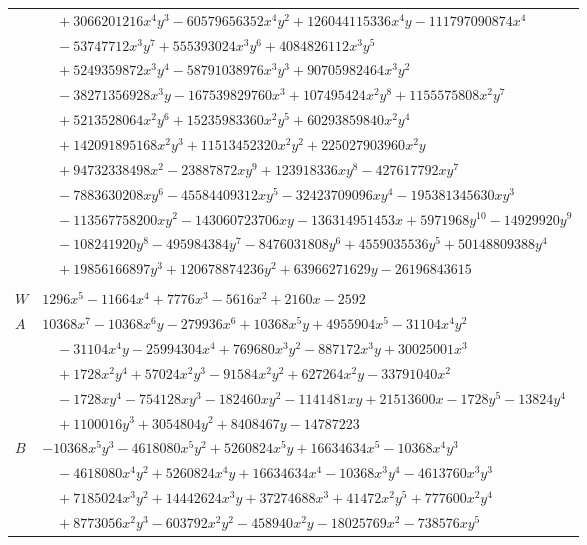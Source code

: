 \documentclass[11pt]{article}
\begin{document}
\begin{longtable}{@{}ll@{}}
 & $\quad +3066201216x^{4}y^{3}-60579656352x^{4}y^{2}+126044115336x^{4}y-111797090874x^{4}$\\
 & $\quad -53747712x^{3}y^{7}+555393024x^{3}y^{6}+4084826112x^{3}y^{5}$\\
 & $\quad +5249359872x^{3}y^{4}-58791038976x^{3}y^{3}+90705982464x^{3}y^{2}$\\
 & $\quad -38271356928x^{3}y-167539829760x^{3}+107495424x^{2}y^{8}+1155575808x^{2}y^{7}$\\
 & $\quad +5213528064x^{2}y^{6}+15235983360x^{2}y^{5}+60293859840x^{2}y^{4}$\\
 & $\quad +142091895168x^{2}y^{3}+11513452320x^{2}y^{2}+225027903960x^{2}y$\\
 & $\quad +94732338498x^{2}-23887872xy^{9}+123918336xy^{8}-427617792xy^{7}$\\
 & $\quad -7883630208xy^{6}-45584409312xy^{5}-32423709096xy^{4}-195381345630xy^{3}$\\
 & $\quad -113567758200xy^{2}-143060723706xy-136314951453x+5971968y^{10}-14929920y^{9}$\\
 & $\quad -108241920y^{8}-495984384y^{7}-8476031808y^{6}+4559035536y^{5}+50148809388y^{4}$\\
 & $\quad +19856166897y^{3}+120678874236y^{2}+63966271629y-26196843615$\\
\addlinespace[3pt]
\multicolumn{2}{@{}l}{$i=30$, $m=144$, neighbours $114,5,25,33,69,96,106$}\\
$W$ & $1296x^{5}-11664x^{4}+7776x^{3}-5616x^{2}+2160x-2592$\\
$A$ & $10368x^{7}-10368x^{6}y-279936x^{6}+10368x^{5}y+4955904x^{5}-31104x^{4}y^{2}$\\
 & $\quad -31104x^{4}y-25994304x^{4}+769680x^{3}y^{2}-887172x^{3}y+30025001x^{3}$\\
 & $\quad +1728x^{2}y^{4}+57024x^{2}y^{3}-91584x^{2}y^{2}+627264x^{2}y-33791040x^{2}$\\
 & $\quad -1728xy^{4}-754128xy^{3}-182460xy^{2}-1141481xy+21513600x-1728y^{5}-13824y^{4}$\\
 & $\quad +1100016y^{3}+3054804y^{2}+8408467y-14787223$\\
$B$ & $-10368x^{5}y^{3}-4618080x^{5}y^{2}+5260824x^{5}y+16634634x^{5}-10368x^{4}y^{3}$\\
 & $\quad -4618080x^{4}y^{2}+5260824x^{4}y+16634634x^{4}-10368x^{3}y^{4}-4613760x^{3}y^{3}$\\
 & $\quad +7185024x^{3}y^{2}+14442624x^{3}y+37274688x^{3}+41472x^{2}y^{5}+777600x^{2}y^{4}$\\
 & $\quad +8773056x^{2}y^{3}-603792x^{2}y^{2}-458940x^{2}y-18025769x^{2}-738576xy^{5}$\\

\end{longtable}
\end{document}
